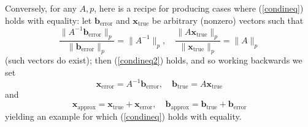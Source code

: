 \documentclass{article}
\begin{document}
Conversely, for any $A,p$, here is a recipe for producing cases
where (\ref{condineq}) holds with equality:
let $\mathbf{b}_{\text{error}}$ and $\mathbf{x}_{\text{true}}$ be arbitrary
(nonzero) vectors such that
\begin{equation}\label{recipe1}
	\frac{\lVert A^{-1} \mathbf{b}_{\text{error}}\rVert_p}
	{\lVert \mathbf{b}_{\text{error}}\rVert_p}
	= \lVert A^{-1} \rVert_p, \quad
	\frac{\lVert A\mathbf{x}_{\text{true}}\rVert_p}
	{\lVert \mathbf{x}_{\text{true}}\rVert_p}
	= \lVert A \rVert_p
\end{equation}
(such vectors do exist); then (\ref{condineq2}) holds, and so working backwards we set
\begin{equation}\label{recipe2}
	\mathbf{x}_{\text{error}} = A^{-1}\mathbf{b}_{\text{error}},
	\quad \mathbf{b}_{\text{true}} = A\mathbf{x}_{\text{true}}
\end{equation}
and
\begin{equation}
	\mathbf{x}_{\text{approx}} = \mathbf{x}_{\text{true}} + \mathbf{x}_{\text{error}},
	\quad \mathbf{b}_{\text{approx}} = \mathbf{b}_{\text{true}} + \mathbf{b}_{\text{error}}
\end{equation}
yielding an example for which (\ref{condineq}) holds with equality.
\end{document}

